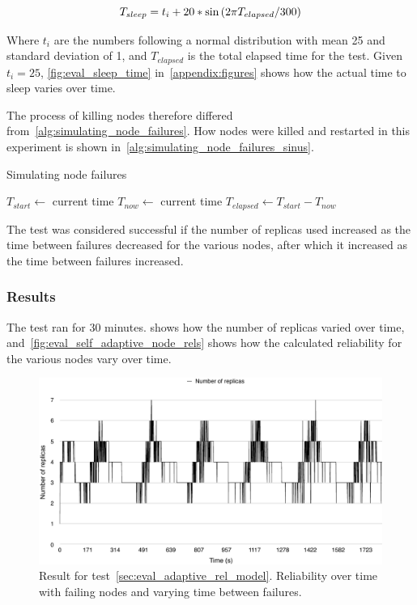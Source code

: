 \documentclass{cslthse-msc}
\begin{document}
\begin{equation} \label{eq:eval_sleep_time}
T_{sleep} = t_i + 20 * \sin{(2\*\pi\*T_{elapsed} / 300)}
\end{equation}

Where $t_i$ are the numbers following a normal distribution with mean 25 and standard deviation of 1, and $T_{elapsed}$ is the total elapsed time for the test. Given $t_i=25$, \cref{fig:eval_sleep_time} in~\cref{appendix:figures} shows how the actual time to sleep varies over time.

The process of killing nodes therefore differed from~\cref{alg:simulating_node_failures}. How nodes were killed and restarted in this experiment is shown in~\cref{alg:simulating_node_failures_sinus}.

\begin{algorithm} 
	\caption{Simulating node failures} \label{alg:simulating_node_failures_sinus}
	\begin{algorithmic}[1]
	\State $T_{start}\gets$ current time
		\State
		\State $T_{now}\gets$ current time
		\State $T_{elapsed}\gets T_{start}-T_{now}$
		\State
		\State
	\EndWhile
	\end{algorithmic}
\end{algorithm}

The test was considered successful if the number of replicas used increased as the time between failures decreased for the various nodes, after which it increased as the time between failures increased.

\subsubsection*{Results}
The test ran for 30 minutes.  shows how the number of replicas varied over time, and~\cref{fig:eval_self_adaptive_node_rels} shows how the calculated reliability for the various nodes vary over time. 

\begin{figure}[!hbt]
\centering
\includegraphics[scale=0.5]{images/results/self_adaptive_replicas.pdf}
\caption{Result for test~\ref{sec:eval_adaptive_rel_model}. Reliability over time with failing nodes and varying time between failures.} \label{fig:eval_self_adaptive_rel}
\end{figure}
\end{document}
